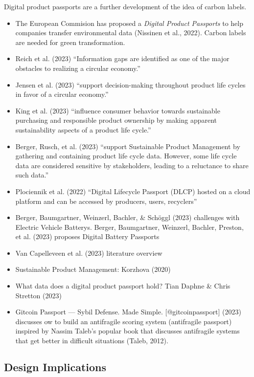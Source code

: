 \documentclass[
  letterpaper,
  DIV=11,
  numbers=noendperiod]{scrartcl}
\begin{document}
Digital product passports are a further development of the idea of
carbon labels.

\begin{itemize}
\item
  The European Commision has proposed a \emph{Digital Product Passports}
  to help companies transfer environmental data (Nissinen et al., 2022).
  Carbon labels are needed for green transformation.
\item
  Reich et al. (2023) ``Information gaps are identified as one of the
  major obstacles to realizing a circular economy.''
\item
  Jensen et al. (2023) ``support decision-making throughout product life
  cycles in favor of a circular economy.''
\item
  King et al. (2023) ``influence consumer behavior towards sustainable
  purchasing and responsible product ownership by making apparent
  sustainability aspects of a product life cycle.''
\item
  Berger, Rusch, et al. (2023) ``support Sustainable Product Management
  by gathering and containing product life cycle data. However, some
  life cycle data are considered sensitive by stakeholders, leading to a
  reluctance to share such data.''
\item
  Plociennik et al. (2022) ``Digital Lifecycle Passport (DLCP) hosted on
  a cloud platform and can be accessed by producers, users, recyclers''
\item
  Berger, Baumgartner, Weinzerl, Bachler, \& Schöggl (2023) challenges
  with Electric Vehicle Batterys. Berger, Baumgartner, Weinzerl,
  Bachler, Preston, et al. (2023) proposes Digital Battery Passports
\item
  Van Capelleveen et al. (2023) literature overview
\item
  Sustainable Product Management: Korzhova (2020)
\item
  What data does a digital product passport hold? Tian Daphne \& Chris
  Stretton (2023)
\item
  Gitcoin Passport --- Sybil Defense. Made Simple.
  {[}@gitcoinpassport{]} (2023) discusses ow to build an antifragile
  scoring system (antifragile passport) inspired by Nassim Taleb's
  popular book that discusses antifragile systems that get better in
  difficult situations (Taleb, 2012).
\end{itemize}

\subsection{Design Implications}\label{design-implications-2}
\end{document}
